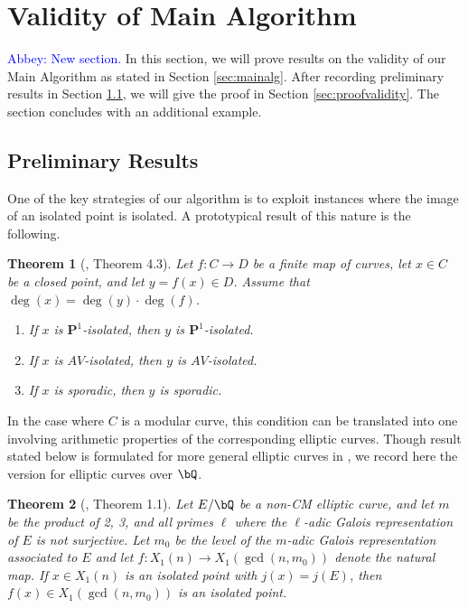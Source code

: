 \documentclass[11pt,reqno]{amsart}
\theoremstyle{plain}
\newtheorem{theorem}{Theorem}%
\theoremstyle{definition}
\newcommand{\Q}{\bQ}
\newcommand{\PP}{\mathbf P}
\newcommand{\abbey}[1]{\textcolor{blue}{Abbey: #1}}
\begin{document}
\section{Validity of Main Algorithm}
\label{sec:validity}

\abbey{New section.} In this section, we will prove results on the validity of our Main Algorithm as stated in Section \ref{sec:mainalg}. After recording preliminary results in Section \ref{sec:prelimresult}, we will give the proof in Section \ref{sec:proofvalidity}. The section concludes with an additional example.

\subsection{Preliminary Results}
\label{sec:prelimresult}
One of the key strategies of our algorithm is to exploit instances where the image of an isolated point is isolated. A prototypical result of this nature is the following.
\begin{theorem}[\cite{BELOV}, Theorem 4.3]
\label{thm:PushingForwardSporadicIsolated}
    Let $f\colon C \to D$ be a finite map of curves, let $x\in C$ be a closed point, and let $y = f(x) \in D$.  Assume that $\deg(x) = \deg(y)\cdot\deg(f)$.
    \begin{enumerate}
        \item If $x$ is $\PP^1$-isolated, then $y$ is $\PP^1$-isolated.
                \item If $x$ is $AV$-isolated, then $y$ is $AV$-isolated.
        \item If $x$ is sporadic, then $y$ is sporadic.
    \end{enumerate}
\end{theorem}

In the case where $C$ is a modular curve, this condition can be translated into one involving arithmetic properties of the corresponding elliptic curves. Though result stated below is formulated for more general elliptic curves in \cite{BELOV}, we record here the version for elliptic curves over $\Q$.

\begin{theorem}[\cite{BELOV}, Theorem 1.1]\label{BELOVthm}
Let $E/\Q$ be a non-CM elliptic curve, and let $m$ be the product of 2, 3, and all primes $\ell$ where the $\ell$-adic Galois representation of $E$ is not surjective. Let $m_0$ be the level of the $m$-adic Galois representation associated to $E$ and let $f\colon X_1(n) \rightarrow X_1(\gcd(n,m_0))$ denote the natural map. If $x\in X_1(n)$ is an isolated point with $j(x)=j(E)$, then $f(x)\in X_1(\gcd(n,m_0))$ is an isolated point.
\end{theorem}
\end{document}

